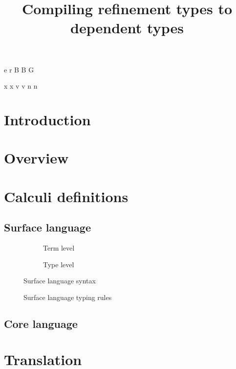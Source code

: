 \documentclass[a4paper]{article}
\begin{document}
\newnonterm e \varepsilon
{}
\newnonterm r \rho
{}
\newnonterm B B
\newnonterm G \Gamma
{}

\newgterm x x
\newgterm v v
\newgterm n n


\title{Compiling refinement types to dependent types}

\maketitle

\section{Introduction}

\section{Overview}

\section{Calculi definitions}

\subsection{Surface language}

\begin{figure}[ht]
  \footnotesize
  \begin{subfigure}{.6\textwidth}
	\caption{Term level}
  \end{subfigure}
  \begin{subfigure}{.5\textwidth}
	\caption{Type level}
  \end{subfigure}
  \caption{Surface language syntax}
  \label{fig:surface_syntax}
\end{figure}

\begin{figure}[ht]
  \footnotesize
  \caption{Surface language typing rules}
  \label{fig:surface_typing}
\end{figure}

\subsection{Core language}

\section{Translation}
\end{document}
